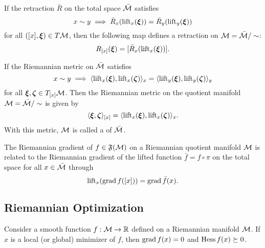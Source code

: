 \documentclass[11pt,a4paper]{article}
\begin{document}
\begin{prop}
If the retraction $\bar{R}$ on the total space $\bar{\mathcal{M}}$ satisfies
\begin{equation*}
x\sim y\implies \bar{R}_x(\text{lift}_x(\boldsymbol\xi)) = \bar{R}_y(\text{lift}_y(\boldsymbol\xi))
\end{equation*}
for all $([x],\boldsymbol\xi)\in T\mathcal{M}$, then the following map defines a retraction on $\mathcal{M} = \bar{\mathcal{M}}/\sim$:
\begin{equation*}
R_{[x]}(\boldsymbol\xi) = [\bar{R}_x(\text{lift}_x(\boldsymbol\xi))].
\end{equation*}
\end{prop}

\begin{prop}
If the Riemannian metric on $\bar{\mathcal{M}}$ satisfies
\begin{equation*}
x\sim y\implies \langle \text{lift}_x(\boldsymbol\xi), \text{lift}_x(\boldsymbol\zeta) \rangle_x = \langle \text{lift}_y(\boldsymbol\xi), \text{lift}_y(\boldsymbol\zeta) \rangle_y
\end{equation*}
for all $\boldsymbol\xi,\boldsymbol\zeta\in T_{[x]}\mathcal{M}$. Then the Riemannian metric on the quotient manifold $\mathcal{M} = \bar{\mathcal{M}}/\sim$ is given by 
\begin{equation*}
\langle \boldsymbol\xi, \boldsymbol\zeta \rangle_{[x]} = \langle \text{lift}_x(\boldsymbol\xi), \text{lift}_x(\boldsymbol\zeta) \rangle_x.
\end{equation*}
With this metric, $\mathcal{M}$ is called a  of $\bar{\mathcal{M}}$.
\end{prop}

\begin{prop}
The Riemannian gradient of $f\in\mathfrak{F}(\mathcal{M})$ on a Riemannian quotient manifold $\mathcal{M}$ is related to the Riemannian gradient of the lifted function $\bar{f} = f\circ \pi$ on the total space for all $x\in \bar{\mathcal{M}}$ through
\begin{equation*}
\text{lift}_x(\text{grad}\, f([x])) = \text{grad}\, \bar{f}(x).
\end{equation*}
\end{prop}

\subsection{Riemannian Optimization}

\begin{prop}
Consider a smooth function $f:\mathcal{M}\rightarrow \mathbb{R}$ defined on a Riemannian manifold $\mathcal{M}$. If $x$ is a local (or global) minimizer of $f$, then $\text{grad}\, f(x) = 0$ and $\text{Hess}\, f(x) \succeq 0$.
\end{prop}
\end{document}
